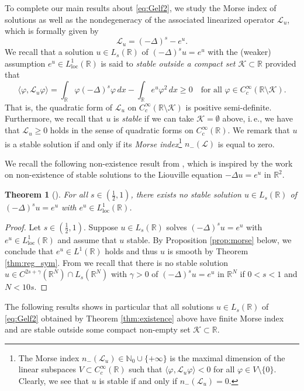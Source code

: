 \documentclass[reqno,10pt,a4paper]{amsart}
\newtheorem{thm}{Theorem}[section]
\theoremstyle{definition}
\theoremstyle{definition}
\theoremstyle{remark}
\theoremstyle{remark}
\numberwithin{equation}{section}
\newcommand{\N}{\mathbb{N}}
\newcommand{\R}{\mathbb{R}}
\newcommand{\be}{\begin{equation}}
\newcommand{\ee}{\end{equation}}
\newcommand{\KK}{\mathcal{K}}
\newcommand{\Ds}{(-\Delta)^{s}}
\renewcommand{\phi}{\varphi}
\newcommand{\Lloc}{L_{\mathrm{loc}}}
\newcommand{\LL}{\mathcal{L}}
\begin{document}
To complete our main results about \eqref{eq:Gelf2}, we study the Morse index of solutions as well as the nondegeneracy of the associated linearized operator $\LL_u$, which is formally given by
\be
\LL_u = \Ds - e^u .
\ee
We recall that a solution $u \in L_s(\R)$ of $\Ds u = e^u$ with the (weaker) assumption $e^u \in \Lloc^1(\R)$ is said to {\em stable outside a compact set $\KK \subset \R$} provided that
\be
\langle \phi, \LL_u \phi \rangle = \int_{\R} \phi \Ds \phi \, dx - \int_\R e^u \phi^2 \, dx \geq 0 \quad \mbox{for all $\phi \in C^\infty_c(\R \setminus \KK)$}.
\ee
That is, the quadratic form of $\LL_u$ on $C^\infty_c(\R \setminus \KK)$ is positive semi-definite. Furthermore, we recall that $u$ is {\em stable} if we can take $\KK=\emptyset$ above, i.\,e., we have that $\LL_u \geq 0$ holds in the sense of quadratic forms on $C^\infty_c(\R)$. We remark that $u$ is a stable solution if and only if its {\em Morse index}\footnote{The Morse index $n_-(\LL_u) \in \N_0 \cup \{ +\infty \}$ is the maximal dimension of the linear subspaces $V \subset C^\infty_c(\R)$ such that $\langle \phi, \LL_u \phi \rangle < 0$ for all $\phi \in V \setminus \{ 0 \}$. Clearly, we see that $u$ is stable if and only if $n_-(\LL_u) = 0$.} $n_-(\LL)$ is equal to zero. 

We recall the following non-existence result from \cite{DuNg-22}, which is inspired by the work \cite{Fa-07} on non-existence of stable solutions to the Liouville equation $-\Delta u = e^u$ in $\R^2$. 

\begin{thm}[\cite{DuNg-22}] \label{thm:non_existence}
For all $s \in (\frac{1}{2},1)$, there exists no stable solution $u \in L_s(\R)$ of $\Ds u = e^u$ with $e^u \in \Lloc^1(\R)$. 
\end{thm} 

\begin{proof}
Let $s \in (\frac 1 2, 1)$. Suppose $u \in L_s(\R)$ solves $\Ds u = e^u$ with $e^u \in \Lloc^1(\R)$ and assume that $u$ stable. By Proposition \ref{prop:morse} below, we conclude that $e^u \in L^1(\R)$ holds and thus $u$ is smooth by Theorem \ref{thm:reg_sym}. From \cite{DuNg-22} we recall that there is no stable solution $u \in C^{2s+\gamma}(\R^N) \cap L_s(\R^N)$ with $\gamma > 0$ of $(-\Delta)^s u = e^u$ in $\R^N$ if $0 < s < 1$ and $N < 10s$.
\end{proof}

The following results shows in particular that all solutions $u \in L_s(\R)$ of \eqref{eq:Gelf2} obtained by Theorem \ref{thm:existence} above have finite Morse index and are stable outside some compact non-empty set $\KK \subset \R$. 
\end{document}
